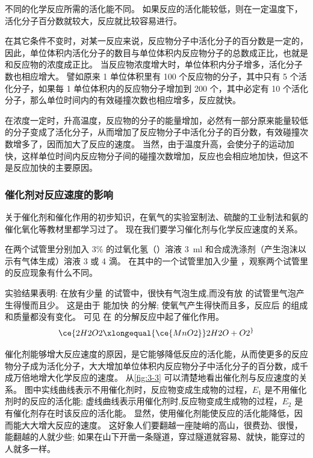 不同的化学反应所需的活化能不同。
如果反应的活化能较低，则在一定温度下，活化分子百分数就较大，反应就比较容易进行。

在其它条件不变时，对某一反应来说，反应物分子中活化分子的百分数是一定的，因此，单位体积内活化分子的数目与单位体积内反应物分子的总数成正比，也就是和反应物的浓度成正比。
当反应物浓度增大时，单位体积内分子增多，活化分子数也相应增大。
譬如原来 1 单位体积里有 100 个反应物的分子，其中只有 5 个活化分子，如果每 1 单位体积内的反应物分子增加到 200 个，其中必定有 10 个活化分子，那么单位时间内的有效碰撞次数也相应增多，反应就快。

在浓度一定时，升高温度，反应物的分子的能量增加，必然有一部分原来能量较低的分子变成了活化分子，从而增加了反应物分子中活化分子的百分数，有效碰撞次数增多了，因而加大了反应的速度。
当然，由于温度升高，会使分子的运动加快，这样单位时间内反应物分子间的碰撞次数增加，反应也会相应地加快，但这不是反应加快的主要原因。

\subsubsection{催化剂对反应速度的影响}
关于催化剂和催化作用的初步知识，在氧气的实验室制法、硫酸的工业制法和氨的催化氧化等教材里都学习过了。
现在我们要学习催化剂与化学反应速度的关系。
\begin{Experiment}
在两个试管里分别加入 3\% 的过氧化氢（）溶液 \qty{3}{ml} 和合成洗涤剂（产生泡沫以示有气体生成）溶液 3 或 4 滴。
在其中的一个试管里加入少量 ，观察两个试管里的反应现象有什么不同。
\end{Experiment}
实验结果表明: 在放有少量  的试管中，很快有气泡生成,而没有放  的试管里气泡产生得慢而且少。
这是由于  能加快  的分解; 使氧气产生得快而且多，反应后  的组成和质量都没有变化。
可见  在  的分解反应中起了催化作用。
\[ \ce{ 2H2O2 \xlongequal{\ce{MnO2}} 2H2O + O2 ^ }\]

催化剂能够增大反应速度的原因，是它能够降低反应的活化能，从而使更多的反应物分子成为活化分子，大大增加单位体积内反应物分子中活化分子的百分数，成千成万倍地增大化学反应的速度。
从\cref{fig:3-3} 可以清楚地看出催化剂与反应速度的关系。
图中实线曲线表示不用催化剂时，反应物变成生成物的过程，$E_1$ 是不用催化剂时的反应的活化能; 虚线曲线表示用催化剂时,反应物变成生成物的过程，$E_2$ 是有催化剂存在时该反应的活化能。
显然，使用催化剂能使反应的活化能降低，因而能大大增大反应的速度。
这好象人们要翻越一座陡峭的高山，很费劲、很慢，能翻越的人就少些; 如果在山下开凿一条隧道，穿过隧道就容易、就快，能穿过的人就多一样。

